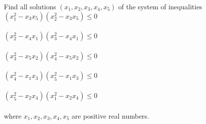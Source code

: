 

\item Find all solutions $(x_1, x_2, x_3, x_4, x_5)$ of the system of inequalities
\\$(x_1^2 - x_3x_5)(x_2^2 - x_3x_5) \leq 0$\\
\\$(x_2^2 - x_4x_1)(x_3^2 - x_4x_1) \leq 0$\\
\\$(x_3^2 - x_5x_2)(x_4^2 - x_5x_2) \leq 0$\\
\\$(x_4^2 - x_1x_3)(x_5^2 - x_1x_3) \leq 0$\\
\\$(x_5^2 - x_2x_4)(x_1^2 - x_2x_4) \leq 0$\\
\\where $x_1, x_2, x_3, x_4, x_5$ are positive real numbers.


